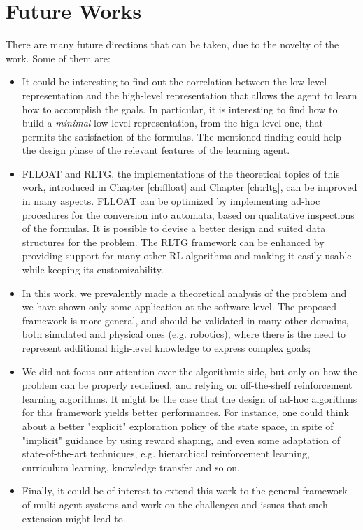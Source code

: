 \section{Future Works}
There are many future directions that can be taken, due to the novelty of the work. Some of them are:
\begin{itemize}
	\item It could be interesting to find out the correlation between the low-level representation and the high-level representation that allows the agent to learn how to accomplish the goals. In particular, it is interesting to find how to build a \emph{minimal} low-level representation, from the high-level one, that permits the satisfaction of the \LLf formulas. The mentioned finding could help the design phase of the relevant features of the learning agent.
	
	\item FLLOAT and RLTG, the implementations of the theoretical topics of this work, introduced in Chapter \ref{ch:flloat} and Chapter \ref{ch:rltg}, can be improved in many aspects. FLLOAT can be optimized by implementing ad-hoc procedures for the conversion into automata, based on qualitative inspections of the formulas. It is possible to devise a better design and suited data structures for the problem. The RLTG framework can be enhanced by providing support for many other RL algorithms and making it easily usable while keeping its customizability.
	
	\item In this work, we prevalently made a theoretical analysis of the problem and we have shown only some application at the software level. The proposed framework is more general, and should be validated in many other domains, both simulated and physical ones (e.g. robotics), where there is the need to represent additional high-level knowledge to express complex goals;
	\item We did not focus our attention over the algorithmic side, but only on how the problem can be properly redefined, and relying on off-the-shelf reinforcement learning algorithms. It might be the case that the design of ad-hoc algorithms for this framework yields better performances. For instance, one could think about a better "explicit" exploration policy of the state space, in spite of "implicit" guidance by using reward shaping, and even some adaptation of state-of-the-art techniques, e.g. hierarchical reinforcement learning, curriculum learning, knowledge transfer and so on.
	\item Finally, it could be of interest to extend this work to the general framework of multi-agent systems and work on the challenges and issues that such extension might lead to.
\end{itemize}

